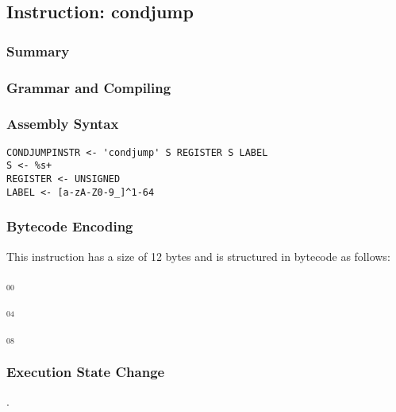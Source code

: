 \subsection{Instruction: condjump}

\subsubsection{Summary}


\subsubsection{Grammar and Compiling}


\subsubsection{Assembly Syntax}

\begin{myquote}
\begin{verbatim}
CONDJUMPINSTR <- 'condjump' S REGISTER S LABEL
S <- %s+
REGISTER <- UNSIGNED
LABEL <- [a-zA-Z0-9_]^1-64
\end{verbatim}
\end{myquote}


\subsubsection{Bytecode Encoding}

This instruction has a size of 12 bytes and is structured in bytecode as follows:

$_{00}$\ 



$_{04}$\ 



$_{08}$\ 
\fbox{%
  \parbox{20pt}{%
00
  }%
}


\subsubsection{Execution State Change}

.


